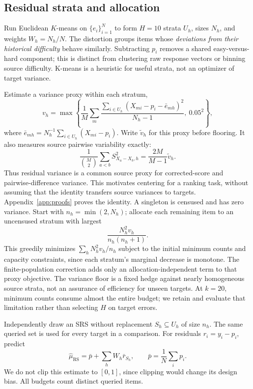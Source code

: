 \documentclass{article}
\newcommand{\rrs}{\mathrm{RS}}
\begin{document}
\subsection{Residual strata and allocation}
Run Euclidean $K$-means on $\{e_i\}_{i=1}^N$ to form $H=10$ strata $U_h$, sizes $N_h$, and weights $W_h=N_h/N$. The distortion groups items whose \emph{deviations from their historical difficulty} behave similarly. Subtracting $p_i$ removes a shared easy-versus-hard component; this is distinct from clustering raw response vectors or binning source difficulty. K-means is a heuristic for useful strata, not an optimizer of target variance.

Estimate a variance proxy within each stratum,
\begin{equation}
v_h=\max\left\{\frac1M\sum_m\frac{\sum_{i\in U_h}(X_{mi}-p_i-\bar e_{mh})^2}{N_h-1},\ 0.05^2\right\},
\label{eq:proxy}
\end{equation}
where $\bar e_{mh}=N_h^{-1}\sum_{i\in U_h}(X_{mi}-p_i)$. Write $\widetilde v_h$ for this proxy before flooring. It also measures source pairwise variability exactly:
\begin{equation}
\frac1{\binom M2}\sum_{a<b}S^2_{X_a-X_b,h}=\frac{2M}{M-1}\widetilde v_h.
\label{eq:source-pairs}
\end{equation}
Thus residual variance is a common source proxy for corrected-score and pairwise-difference variance. This motivates centering for a ranking task, without assuming that the identity transfers source variances to targets. Appendix~\ref{app:proofs} proves the identity. A singleton is censused and has zero variance. Start with $n_h=\min(2,N_h)$; allocate each remaining item to an uncensused stratum with largest
\begin{equation}
\frac{N_h^2v_h}{n_h(n_h+1)}.
\label{eq:allocation}
\end{equation}
This greedily minimizes $\sum_h N_h^2v_h/n_h$ subject to the initial minimum counts and capacity constraints, since each stratum's marginal decrease is monotone. The finite-population correction adds only an allocation-independent term to that proxy objective. The variance floor is a fixed hedge against nearly homogeneous source strata, not an assurance of efficiency for unseen targets. At $k=20$, minimum counts consume almost the entire budget; we retain and evaluate that limitation rather than selecting $H$ on target errors.

Independently draw an SRS without replacement $S_h\subseteq U_h$ of size $n_h$. The same queried set is used for every target in a comparison. For residuals $r_i=y_i-p_i$, predict
\begin{equation}
\widehat\mu_{\rrs}=\bar p+\sum_h W_h\bar r_{S_h},\qquad
\bar p=\frac1N\sum_i p_i.
\label{eq:estimator}
\end{equation}
We do not clip this estimate to $[0,1]$, since clipping would change its design bias. All budgets count distinct queried items.
\end{document}
